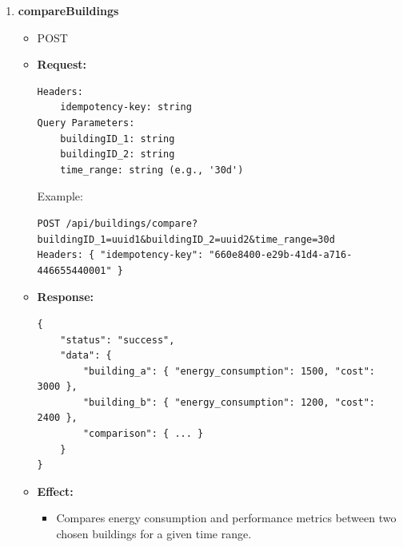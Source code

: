 \documentclass[12pt, a4paper]{article}
\begin{document}
\begin{enumerate}
\begin{itemize}
\begin{verbatim}
{
    "status": "success",
    "message": "Building successfully deleted"
}
        \end{verbatim}
        \item \textbf{Effect:}
        \begin{itemize}
            \item  Removes a building from the database.
            \item Requires ADMIN access
        \end{itemize}
    \end{itemize}
    \item \textbf{compareBuildings}
    \begin{itemize}
        \item POST 
        \item \textbf{Request:}
        \begin{verbatim}
Headers:
    idempotency-key: string
Query Parameters:
    buildingID_1: string
    buildingID_2: string
    time_range: string (e.g., '30d')
        \end{verbatim}
        Example:
        \begin{verbatim}
POST /api/buildings/compare?buildingID_1=uuid1&buildingID_2=uuid2&time_range=30d
Headers: { "idempotency-key": "660e8400-e29b-41d4-a716-446655440001" }
        \end{verbatim}
        \item \textbf{Response:}
        \begin{verbatim}
{
    "status": "success",
    "data": {
        "building_a": { "energy_consumption": 1500, "cost": 3000 },
        "building_b": { "energy_consumption": 1200, "cost": 2400 },
        "comparison": { ... }
    }
}
        \end{verbatim}
        \item \textbf{Effect:}
        \begin{itemize}
            \item Compares energy consumption and performance metrics between two chosen buildings for a given time range.
        \end{itemize}
    \end{itemize}
\end{enumerate}
\end{document}
